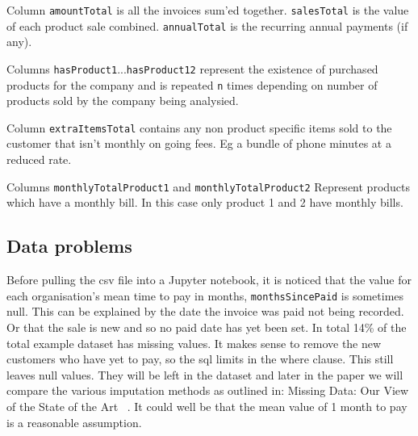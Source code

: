 \documentclass[runningheads]{llncs}
\begin{document}
Column \texttt{amountTotal} is all the invoices sum'ed together. \texttt{salesTotal} is the value of each product sale combined. \texttt{annualTotal} is the recurring annual payments (if any).

Columns \texttt{hasProduct1}...\texttt{hasProduct12} represent the existence of purchased products for the company and is repeated \texttt{n} times depending on number of products sold by the company being analysied.

Column  \texttt{extraItemsTotal} contains any non product specific items sold to the customer that isn't monthly on going fees. Eg  a bundle of phone minutes at a reduced rate.

Columns \texttt{monthlyTotalProduct1} and \texttt{monthlyTotalProduct2} Represent products which have a monthly bill. In this case only product 1 and 2 have monthly bills.

\subsection{Data problems} 
Before pulling the csv file into a Jupyter notebook, it is noticed that the value for each organisation's mean time to pay in months, \texttt{monthsSincePaid} is sometimes null. This can be explained by the date the invoice was paid not being recorded. Or that the sale is new and so no paid date has yet been set. In total 14\% of the total example dataset has missing values. It makes sense to remove the new customers who have yet to pay, so the sql limits in the where clause. This still leaves null values. They will be left in the dataset and later in the paper we will compare the various imputation methods as outlined in: Missing Data: Our View of the State of the Art ~\cite{ref_url2}. It could well be that the mean value of 1 month to pay is a reasonable assumption.
\end{document}

